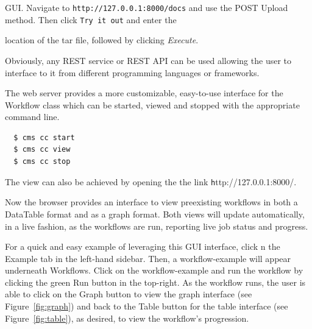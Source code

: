 GUI. Navigate to {\scriptsize \texttt{http://127.0.0.1:8000/docs}} and
use the POST Upload method. Then click \texttt{Try\ it\ out} and enter
the

location of the tar file, followed by clicking {\em Execute}.

Obviously, any REST service or REST API can be used allowing the user to
interface to it from different programming languages or frameworks.

The web server provides a more customizable, easy-to-use interface for
the Workflow class which can be started, viewed and stopped with the
appropriate command line. 

\begin{verbatim}
  $ cms cc start
  $ cms cc view
  $ cms cc stop
\end{verbatim}%


The view can also be achieved by opening the 
the link {\scriptsize\texttt http://127.0.0.1:8000/}.

Now the browser provides an interface to view preexisting workflows in both
a DataTable format and as a graph format. Both views will update
automatically, in a live fashion, as the workflows are run, reporting
live job status and progress.

For a quick and easy example of leveraging this GUI interface, click
n the Example tab in the left-hand sidebar. Then, a workflow-example
will appear underneath Workflows. Click on the workflow-example and
run the workflow by clicking the green Run button in the top-right. As
the workflow runs, the user is able to click on the Graph button
to view the graph interface (see Figure~\ref{fig:graph}) and back to the
Table button for the table interface (see Figure~\ref{fig:table}), as
desired, to view the workflow's progression.


